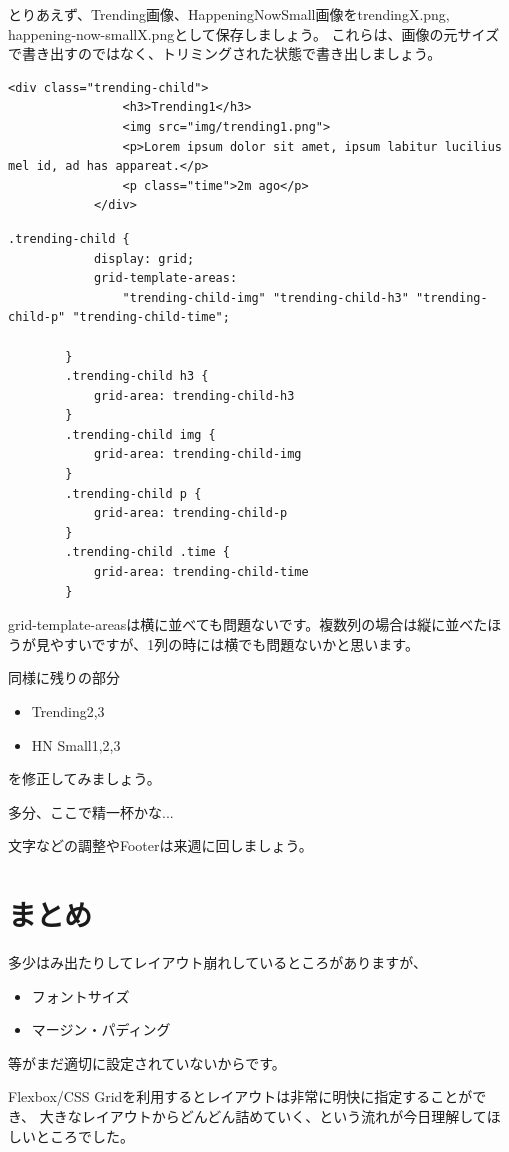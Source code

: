 \documentclass[mingoth,11pt,a4j,uplatex,dvipdfmx]{jsarticle}
\begin{document}
とりあえず、Trending画像、HappeningNowSmall画像をtrendingX.png, happening-now-smallX.pngとして保存しましょう。
これらは、画像の元サイズで書き出すのではなく、トリミングされた状態で書き出しましょう。

\begin{lstlisting}[caption=.trending-childのHTML変更]
            <div class="trending-child">
                <h3>Trending1</h3>
                <img src="img/trending1.png">
                <p>Lorem ipsum dolor sit amet, ipsum labitur lucilius mel id, ad has appareat.</p>
                <p class="time">2m ago</p>
            </div>
\end{lstlisting}

\begin{lstlisting}[caption=.trending-childのレイアウト]
        .trending-child {
            display: grid;
            grid-template-areas: 
                "trending-child-img" "trending-child-h3" "trending-child-p" "trending-child-time";

        }
        .trending-child h3 {
            grid-area: trending-child-h3
        }
        .trending-child img {
            grid-area: trending-child-img
        }
        .trending-child p {
            grid-area: trending-child-p
        }
        .trending-child .time {
            grid-area: trending-child-time
        }
\end{lstlisting}

grid-template-areasは横に並べても問題ないです。複数列の場合は縦に並べたほうが見やすいですが、1列の時には横でも問題ないかと思います。

同様に残りの部分
\begin{itemize}
\item Trending2,3
\item HN Small1,2,3
\end{itemize}
を修正してみましょう。

多分、ここで精一杯かな...

文字などの調整やFooterは来週に回しましょう。

\section{まとめ}
多少はみ出たりしてレイアウト崩れしているところがありますが、
\begin{itemize}
\item フォントサイズ
\item マージン・パディング
\end{itemize}
等がまだ適切に設定されていないからです。

Flexbox/CSS Gridを利用するとレイアウトは非常に明快に指定することができ、
大きなレイアウトからどんどん詰めていく、という流れが今日理解してほしいところでした。








\end{document}
